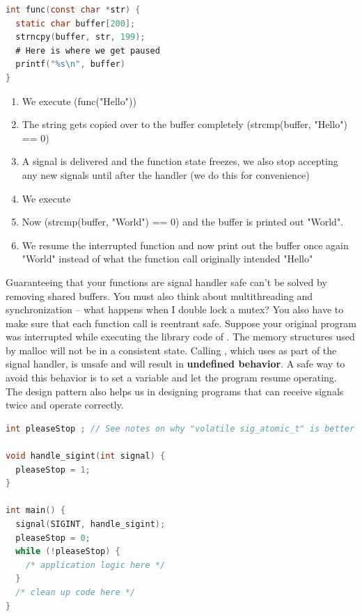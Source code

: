 \begin{lstlisting}[language=C]
int func(const char *str) {
  static char buffer[200];
  strncpy(buffer, str, 199);
  # Here is where we get paused
  printf("%s\n", buffer)
}
\end{lstlisting}

\begin{enumerate}
\item We execute \keyword(func("Hello"))
\item The string gets copied over to the buffer completely (strcmp(buffer, "Hello") == 0)
\item A signal is delivered and the function state freezes, we also stop accepting any new signals until after the handler (we do this for convenience)
\item We execute 
\item Now (strcmp(buffer, "World") == 0) and the buffer is printed out "World".
\item We resume the interrupted function and now print out the buffer once again "World" instead of what the function call originally intended "Hello"
\end{enumerate}

Guaranteeing that your functions are signal handler safe can't be solved by removing shared buffers.
You must also think about multithreading and synchronization -- what happens when I double lock a mutex?
You also have to make sure that each function call is reentrant safe.
Suppose your original program was interrupted while executing the library code of .
The memory structures used by malloc will not be in a consistent state.
Calling , which uses  as part of the signal handler, is unsafe and will result in \textbf{undefined behavior}.
A safe way to avoid this behavior is to set a variable and let the program resume operating.
The design pattern also helps us in designing programs that can receive signals twice and operate correctly.

\begin{lstlisting}[language=C]
int pleaseStop ; // See notes on why "volatile sig_atomic_t" is better

void handle_sigint(int signal) {
  pleaseStop = 1;
}

int main() {
  signal(SIGINT, handle_sigint);
  pleaseStop = 0;
  while (!pleaseStop) {
    /* application logic here */
  }
  /* clean up code here */
}
\end{lstlisting}

